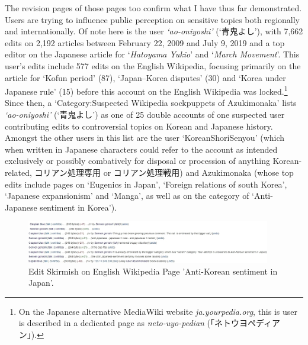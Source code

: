 \documentclass[10pt,british,A4paper,,openany]{memoir}
\begin{document}
The revision pages of those pages too confirm what I have thus far
demonstrated. Users are trying to influence public perception on
sensitive topics both regionally and internationally. Of note here is
the user \emph{`ao-oniyoshi'} (`青鬼よし'), with 7,662 edits on 2,192
articles between February 22, 2009 and July 9, 2019 and a top editor on
the Japanese article for `\emph{Hatoyama Yukio}' and `\emph{March
 Movement}'. This user's edits include 577 edits on the English
Wikipedia, focusing primarily on the article for `Kofun period' (87),
`Japan--Korea disputes' (30) and `Korea under Japanese rule' (15) before
this account on the English Wikipedia was locked.\footnote{On the
  Japanese alternative MediaWiki website \emph{ja.yourpedia.org}, this
  is user is described in a dedicated page as \emph{neto-uyo-pedian}
  (「ネトウヨペディアン」).} Since then, a `Category:Suspected Wikipedia
sockpuppets of Azukimonaka' lists \emph{`ao-oniyoshi'} (`青鬼よし') as
one of 25 double accounts of one suspected user contributing edits to
controversial topics on Korean and Japanese history. Amongst the other
users in this list are the user `KoreanShoriSenyou' (which when written
in Japanese characters could refer to the account as intended
exclusively or possibly combatively for disposal or procession of
anything Korean-related, コリアン処理専用 or コリアン処理戦用) and
Azukimonaka (whose top edits include pages on `Eugenics in Japan',
`Foreign relations of south Korea', `Japanese expansionism' and `Manga',
as well as on the category of `Anti-Japanese sentiment in Korea').

\begin{figure}[!htb]
 \caption{\label{fig:caspian} Edit Skirmish on English Wikipedia Page 'Anti-Korean sentiment in Japan'.}
 \centering
 \includegraphics[width=0.95\textwidth,trim=4 4 4 4,clip]{images/wiki/sennen-caspian2.jpg}
\end{figure}
\end{document}
